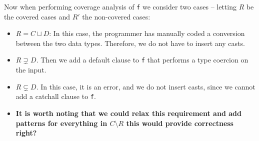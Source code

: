 Now when performing coverage analysis of {\tt f} we consider two cases --
letting $R$ be the covered cases and $R'$ the non-covered cases:
\begin{itemize}
  \item $R = C \sqcup D$: In this case, the programmer has manually
    coded a conversion between the two data types. Therefore, we do not
    have to insert any casts.
  \item $R \supsetneq D$. Then we add a default clause to {\tt f} that performs
    a type coercion on the input.
  \item $R \subsetneq D$. In this case, it is an error, and we do not
    insert casts, since we cannot add a catchall clause to {\tt f}.
  \item {\bf It is
    worth noting that we could relax this requirement and add patterns for
  everything in $C \setminus R$ this would provide correctness right?}
\end{itemize}































































